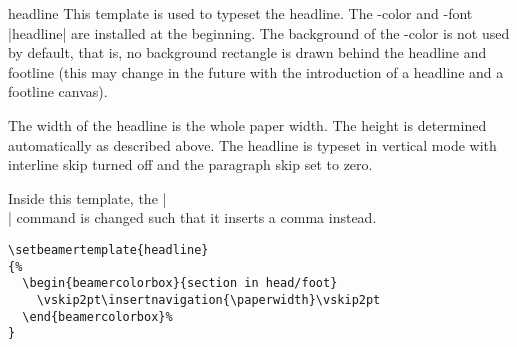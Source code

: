 \begin{element}{headline}\yes\yes\yes
  This template is used to typeset the headline. The \beamer-color and
  -font |headline| are installed at the beginning. The background of
  the \beamer-color is not used by default, that is, no background
  rectangle is drawn behind the headline and footline (this may change
  in the future with the introduction of a headline and a footline
  canvas).

  The width of the headline is the whole paper width. The height is
  determined automatically as described above. The headline is typeset
  in vertical mode with interline skip turned off and the paragraph
  skip set to zero.

  Inside this template, the |\\| command is changed such that it
  inserts a comma instead.

  \example
\begin{verbatim}
\setbeamertemplate{headline}
{%
  \begin{beamercolorbox}{section in head/foot}
    \vskip2pt\insertnavigation{\paperwidth}\vskip2pt
  \end{beamercolorbox}%
}
\end{verbatim}


\end{element}
